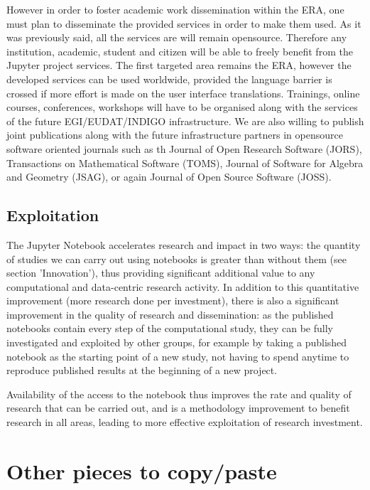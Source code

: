 However in order to foster academic work dissemination within the ERA,
one must plan to disseminate the provided services in order to make them used.
As it was previously said, all the services are will remain opensource. Therefore any
institution, academic, student and citizen will be able to freely benefit from the 
Jupyter project services. The first targeted area remains the ERA, however the developed
services can be used worldwide, provided the language barrier is crossed if more effort is
made on the user interface translations.
Trainings, online courses, conferences, workshops will have to be organised along with the services of the future EGI/EUDAT/INDIGO infrastructure.
We are also willing to publish joint publications along with the future infrastructure partners in opensource software oriented journals such as th Journal of Open Research Software (JORS), Transactions on Mathematical Software (TOMS), Journal of Software for Algebra and Geometry (JSAG), or again Journal of Open Source Software (JOSS).


\subsection{Exploitation}

The Jupyter Notebook accelerates research and impact in two ways: the
quantity of studies we can carry out using notebooks is greater than
without them (see section 'Innovation'), thus providing significant
additional value to any computational and data-centric research
activity. In addition to this quantitative improvement (more research
done per investment), there is also a significant improvement in the
quality of research and dissemination: as the published notebooks
contain every step of the computational study, they can be fully
investigated and exploited by other groups, for example by taking a
published notebook as the starting point of a new study, not having to
spend anytime to reproduce published results at the beginning of a new
project. 

Availability of the access to the notebook thus improves the rate and
quality of research that can be carried out, and is a methodology
improvement to benefit research in all areas, leading to more
effective exploitation of research investment.

\section*{Other pieces to copy/paste}

